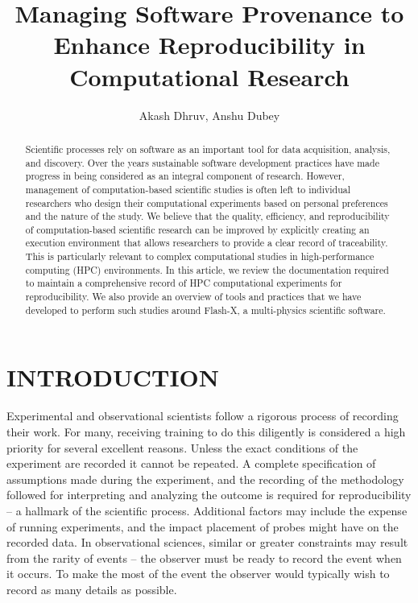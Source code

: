 \documentclass{IEEEcsmag}
\begin{document}
\title{Managing Software Provenance to Enhance Reproducibility in Computational Research}
   
\author{ Akash Dhruv, Anshu Dubey}


\begin{abstract}
%
Scientific processes rely on software as an important tool for data acquisition, analysis, and discovery. Over the years sustainable software development practices have made progress in being considered as an integral component of research. However, management of computation-based scientific studies is often left to individual researchers who design their computational experiments based on personal preferences and the nature of the study. We believe that the quality, efficiency, and reproducibility of computation-based scientific research can be improved by explicitly creating an execution environment that allows researchers to provide a clear record of traceability. This is particularly relevant to complex computational studies in high-performance computing (HPC) environments. In this article, we review the documentation required to maintain a comprehensive record of  HPC computational experiments for reproducibility. We also provide an overview of tools and practices that we have developed to perform such studies around Flash-X, a multi-physics scientific software.

\end{abstract}

\maketitle

\section{INTRODUCTION}
Experimental and observational scientists follow a rigorous process of recording their work. For many, receiving training to do this diligently is considered a high priority for several excellent reasons. Unless the exact conditions of the experiment are recorded it cannot be repeated. A complete specification of assumptions made during the experiment, and the recording of the methodology followed for
interpreting and analyzing the outcome is required for
reproducibility -- a hallmark of the scientific
process. Additional factors may include the expense of running experiments, and the impact placement of probes might have on the recorded data.  In observational sciences, similar or greater constraints may result from the rarity of events -- the observer
must be ready to record the event when it occurs. To make the most of the event the observer would typically
wish to record as many details as possible.
\end{document}
